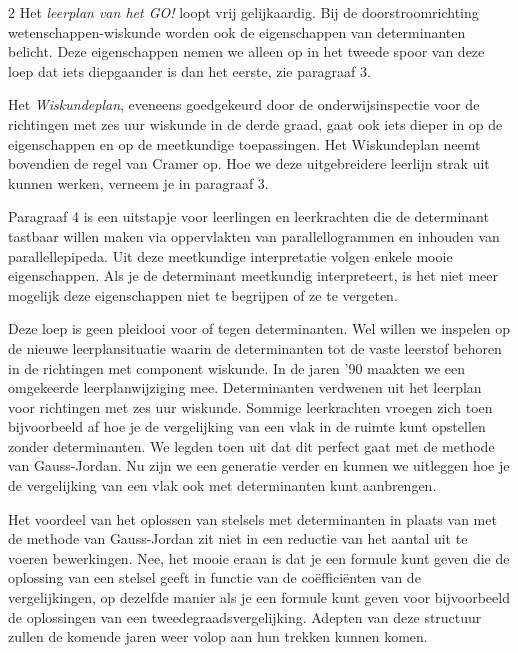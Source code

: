 \begin{multicols}{2}
Het \emph{leerplan van het GO!} loopt vrij gelijkaardig. Bij de doorstroomrichting wetenschappen-wiskunde worden ook de eigenschappen van determinanten belicht. Deze eigenschappen nemen we alleen op in het tweede spoor van deze loep dat iets diepgaander is dan het eerste, zie paragraaf 3.

Het \emph{Wiskundeplan}, eveneens goedgekeurd door de onderwijsinspectie voor de richtingen met zes uur wiskunde in de derde graad, gaat ook iets dieper in op de eigenschappen en op de meetkundige toepassingen. Het Wiskundeplan neemt bovendien de regel van Cramer op. Hoe we deze uitgebreidere leerlijn strak uit kunnen werken, verneem je in paragraaf 3.

Paragraaf 4 is een uitstapje voor leerlingen en leerkrachten die de determinant tastbaar willen maken via oppervlakten van parallellogrammen en inhouden van parallellepipeda. Uit deze meetkundige interpretatie volgen enkele mooie eigenschappen. Als je de determinant meetkundig interpreteert, is het niet meer mogelijk deze eigenschappen niet te begrijpen of ze te vergeten.

Deze loep is geen pleidooi voor of tegen determinanten. Wel willen we inspelen op de nieuwe leerplansituatie waarin de determinanten tot de vaste leerstof behoren in de richtingen met component wiskunde. In de jaren '90 maakten we een omgekeerde leerplanwijziging mee. Determinanten verdwenen uit het leerplan voor richtingen met zes uur wiskunde. Sommige leerkrachten vroegen zich toen bijvoorbeeld af hoe je de vergelijking van een vlak in de ruimte kunt opstellen zonder determinanten. We legden toen uit dat dit perfect gaat met de methode van Gauss-Jordan. Nu zijn we een generatie verder en kunnen we uitleggen hoe je de vergelijking van een vlak ook met determinanten kunt aanbrengen. 

Het voordeel van het oplossen van stelsels met determinanten in plaats van met de methode van Gauss-Jordan zit niet in een reductie van het aantal uit te voeren bewerkingen. Nee, het mooie eraan is dat je een formule kunt geven die de oplossing van een stelsel geeft in functie van de coëfficiënten van de vergelijkingen, op dezelfde manier als je een formule kunt geven voor bijvoorbeeld de oplossingen van een tweedegraadsvergelijking. Adepten van deze structuur zullen de komende jaren weer volop aan hun trekken kunnen komen.

\end{multicols}

